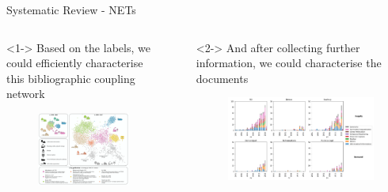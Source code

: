 \documentclass[9pt]{beamer}
\begin{document}
\begin{frame}{Systematic Review - NETs}
\begin{columns}
	\small
	\begin{column}{0.5\linewidth}<1->
		Based on the labels, we could efficiently characterise this bibliographic coupling network 
	\begin{figure}
		\includegraphics[width=\linewidth]{images/NETs_network}
		\caption{\citep{Minx2018}}
	\end{figure}
	\end{column}
	\begin{column}{0.5\linewidth}
		\begin{itemize}
			\itemsep-1em
			\item[]<2-> And after collecting further information, we could characterise the documents
			\begin{figure}
				\includegraphics[width=0.8\linewidth]{images/nets_3}
				\caption{\citep{Nemet2018}}
			\end{figure}

\end{itemize}
\end{column}
\end{columns}
\end{frame}
\end{document}
